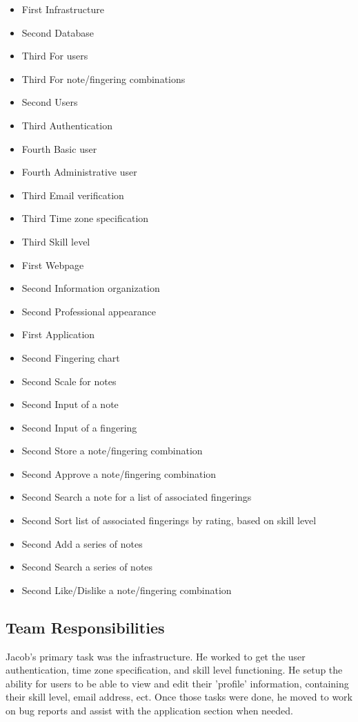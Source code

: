 \documentclass[12pt,english]{article}
\begin{document}
\begin{itemize}
\item First Infrastructure
\item Second Database
\item Third For users
\item Third For note/fingering combinations
\item Second Users
\item Third Authentication
\item Fourth Basic user
\item Fourth Administrative user
\item Third Email verification
\item Third Time zone specification
\item Third Skill level
\item First Webpage
\item Second Information organization
\item Second Professional appearance
\item First Application
\item Second Fingering chart
\item Second Scale for notes
\item Second Input of a note
\item Second Input of a fingering
\item Second Store a note/fingering combination
\item Second Approve a note/fingering combination
\item Second Search a note for a list of associated fingerings
\item Second Sort list of associated fingerings by rating, based on skill level
\item Second Add a series of notes
\item Second Search a series of notes
\item Second Like/Dislike a note/fingering combination
\end{itemize}

\subsection{Team Responsibilities}

Jacob's primary task was the infrastructure.  He worked to get the user
authentication, time zone specification, and skill level functioning.
He setup the ability for users to be able to view and edit their 'profile'
information, containing their skill level, email address, ect.  Once those
tasks were done, he moved to work on bug reports and assist with the application
section when needed.
\end{document}
